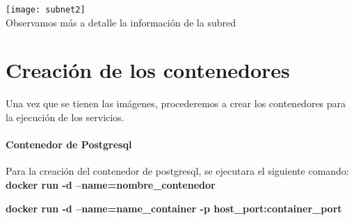 \documentclass[10pt,letterpaper]{article}
\begin{document}
\begin{center}
\texttt{[image: subnet2]}\\
Observamos más a detalle la información de la subred
\end{center}

\section{Creación de los contenedores}
Una vez que se tienen las imágenes, procederemos a crear los contenedores para la ejecución de los servicios.

\paragraph{Contenedor de Postgresql}

Para la creación del contenedor de postgresql, se ejecutara el siguiente comando:\\

\textbf{docker run -d --name=nombre\_contenedor }

\textbf{docker run -d --name=name\_container -p host\_port:container\_port }
\end{document}
